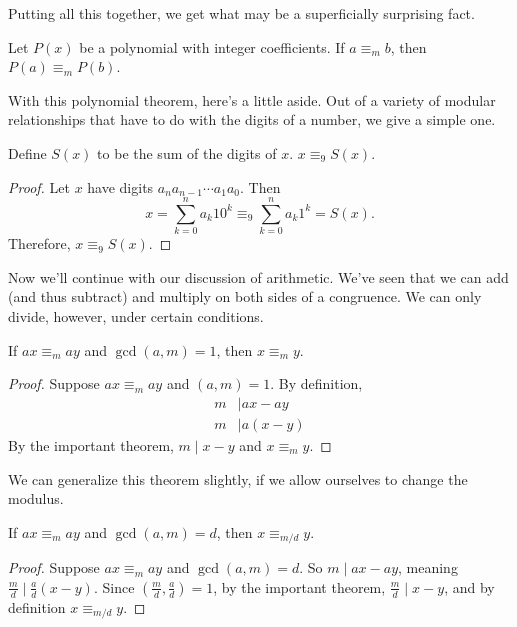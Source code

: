 \documentclass[../m055main.tex]{subfiles}
\begin{document}
Putting all this together, we get what may be a superficially surprising fact.

\begin{corollary}
    Let $P(x)$ be a polynomial with integer coefficients.
    If $a \equiv_m b$, then $P(a) \equiv_m P(b)$.
\end{corollary}

With this polynomial theorem, here's a little aside.
Out of a variety of modular relationships that have to do with the digits of a number, we give a simple one.

\begin{theorem}
    Define $S(x)$ to be the sum of the digits of $x$.
    $x \equiv_9 S(x)$.
\end{theorem}

\begin{proof}
    Let $x$ have digits $a_n a_{n-1} \cdots a_1 a_0$.
    Then
    \[ x = \sum_{k=0}^n a_k 10^k \equiv_9 \sum_{k=0}^n a_k 1^k = S(x). \]
    Therefore, $x \equiv_9 S(x)$.
\end{proof}

Now we'll continue with our discussion of arithmetic.
We've seen that we can add (and thus subtract) and multiply on both sides of a congruence.
We can only divide, however, under certain conditions.

\begin{theorem}
    If $ax \equiv_m ay$ and $\gcd (a,m) = 1$, then $x \equiv_m y$.
\end{theorem}

\begin{proof}
    Suppose $ax \equiv_m ay$ and $(a,m) = 1$.
    By definition,
    \begin{align*}
        m &\mid ax - ay \\
        m &\mid a (x - y)
    \end{align*}
    By the important theorem, $m \mid x - y$ and $x \equiv_m y$.
\end{proof}

We can generalize this theorem slightly, if we allow ourselves to change the modulus.

\begin{theorem}
    If $ax \equiv_m ay$ and $\gcd (a,m) = d$, then $x \equiv_{m/d} y$.
\end{theorem}

\begin{proof}
    Suppose $ax \equiv_m ay$ and $\gcd (a,m) = d$.
    So $m \mid ax - ay$, meaning $\frac{m}{d} \mid \frac{a}{d} (x - y)$.
    Since $\left( \frac{m}{d}, \frac{a}{d} \right) = 1$, by the important theorem, $\frac{m}{d} \mid x - y$, and by definition $x \equiv_{m/d} y$.
\end{proof}
\end{document}
